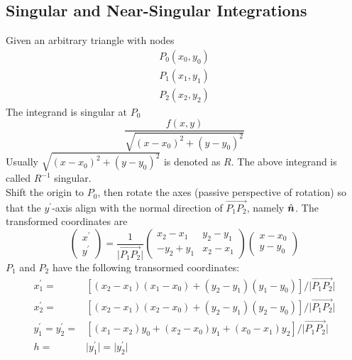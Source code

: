 \documentclass [10pt,letterpaper]{article}
\newcommand{\unitvectorsym}[1]{\hat{\vectorsym{#1}}}
\begin{document}
\subsection{Singular and Near-Singular Integrations}
\label{subsec:singular-and-near-singular-integrations}
Given an arbitrary triangle with nodes
\begin{equation*}
	\begin{split}
		P_0(x_0,y_0)
		\\
		P_1(x_1,y_1)
		\\
		P_2(x_2,y_2) 
	\end{split}
\end{equation*}
The integrand is singular at $P_0$
\begin{equation} \label{eq:singular-near-singular-integrand-2D}
	\frac{ f(x,y) }{ \sqrt{(x-x_0)^2+(y-y_0)^2} }
\end{equation}
Usually $\sqrt{(x-x_0)^2+(y-y_0)^2}$ is denoted as $R$. 
The above integrand is called $R^{-1}$ singular.
\\
Shift the origin to $P_0$, then rotate the axes (passive perspective of rotation) so that the $y^{\prime}$-axis align with the normal direction of $\overrightarrow{P_1 P_2}$, namely $\unitvectorsym{n}$.
The transformed coordinates are
\begin{equation} \label{eq:singular-near-singular-rotate}
	\begin{pmatrix}
		x^{\prime}					\\
		y^{\prime}					
	\end{pmatrix}
	=
	\frac{1}{\lvert \overrightarrow{P_1 P_2} \rvert}
	\begin{pmatrix} 
		x_2-x_1 	& 	y_2-y_1		\\
		-y_2+y_1 	& 	x_2-x_1		
	\end{pmatrix}
	\begin{pmatrix}
		x-x_0					\\
		y-y_0
	\end{pmatrix}
\end{equation}
$P_1$ and $P_2$ have the following transormed coordinates:
\begin{subequations} \label{eq:result-singular-near-singular-x1p-x2p-y1p-y2p}
	\begin{align}
		x_1^{\prime}	
		=&	
		[
			(x_2-x_1)(x_1-x_0)
			+ 
			(y_2-y_1)(y_1-y_0)
		]
		/{\lvert \overrightarrow{P_1 P_2} \rvert}
		\\ 
		x_2^{\prime}	
		=&	
		[
			(x_2-x_1)(x_2-x_0)
			+ 
			(y_2-y_1)(y_2-y_0)
		]
		/{\lvert \overrightarrow{P_1 P_2} \rvert}
		\\
		y_1^{\prime}
		=y_2^{\prime}
		=& 
		[
			(x_1-x_2)y_0
			+
			(x_2-x_0)y_1
			+
			(x_0-x_1)y_2 
		]
		/{\lvert \overrightarrow{P_1 P_2} \rvert}
		\\
		h
		=&
		\lvert y_1^{\prime} \rvert
		=
		\lvert y_2^{\prime} \rvert
	\end{align}
\end{subequations}
\end{document}
